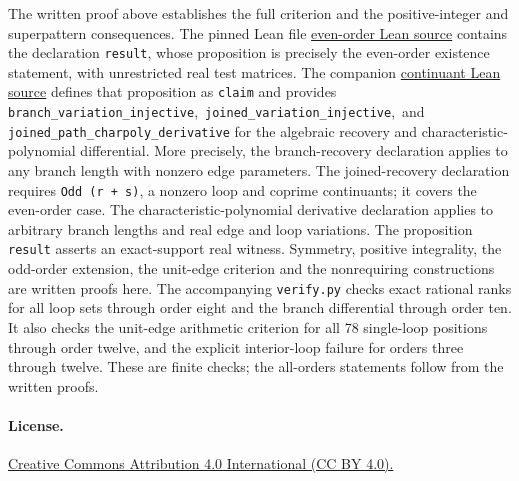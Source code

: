 \documentclass[11pt]{article}
\begin{document}
The written proof above establishes the full criterion and the
positive-integer and superpattern consequences. The pinned Lean file
\href{https://github.com/the-omega-institute/trureturing/blob/b260643d3d496ad9cd04bfc3557fc9b7499de976/D5/S3/Combinatorics/SpectralGraph/KoljancicOblakEvenPathNSSP.lean}{even-order Lean source}
contains the declaration \texttt{result}, whose proposition is precisely
the even-order existence statement, with unrestricted real test matrices.
The companion
\href{https://github.com/the-omega-institute/trureturing/blob/b260643d3d496ad9cd04bfc3557fc9b7499de976/D5/S3/Combinatorics/SpectralGraph/KoljancicOblakEvenPath.lean}{continuant Lean source}
defines that proposition as \texttt{claim} and provides
\texttt{branch\_variation\_injective},\allowbreak\ 
\texttt{joined\_variation\_injective},\allowbreak\ and
\texttt{joined\_path\_charpoly\_derivative} for the algebraic
recovery and characteristic-polynomial differential. More precisely,
the branch-recovery declaration applies to any branch length with
nonzero edge parameters. The joined-recovery declaration requires
\texttt{Odd (r + s)}, a nonzero loop and coprime continuants; it covers
the even-order case. The characteristic-polynomial derivative declaration
applies to arbitrary branch lengths and real edge and loop variations.
The proposition \texttt{result} asserts an exact-support real witness.
Symmetry, positive integrality, the odd-order extension, the unit-edge
criterion and the nonrequiring constructions are written proofs here.
The accompanying \texttt{verify.py} checks exact rational ranks for
all loop sets through order eight and the branch differential through
order ten. It also checks the unit-edge arithmetic criterion for all
78 single-loop positions through order twelve, and the explicit
interior-loop failure for orders three through twelve. These are
finite checks; the all-orders statements follow from the written proofs.

\paragraph{License.}
\href{https://creativecommons.org/licenses/by/4.0/}{Creative Commons
Attribution 4.0 International (CC BY 4.0).}
\end{document}
